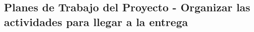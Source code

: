 \subsection{Planes de Trabajo del Proyecto - Organizar las actividades para llegar a la entrega}\label{sec:spmp-9-3}




